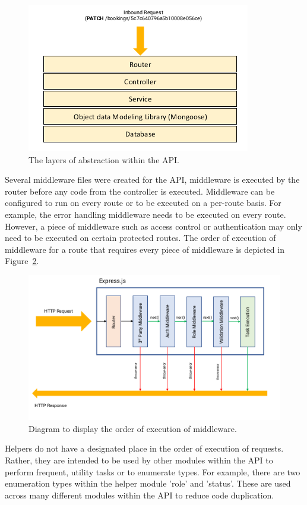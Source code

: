 \begin{figure}[!htb]
	\centering
	\includegraphics[width=0.75\linewidth]{Resources/img/abstraction_layers.png}
	\caption{The layers of abstraction within the API.}
	\label{fig:abstraction_layers}
\end{figure}

Several middleware files were created for the API, middleware is executed by the router before any code from the controller is executed. Middleware can be configured to run on every route or to be executed on a per-route basis. For example, the error handling middleware needs to be executed on every route. However, a piece of middleware such as access control or authentication may only need to be executed on certain protected routes. The order of execution of middleware for a route that requires every piece of middleware is depicted in Figure~\ref{fig:middleware}.

\newpage

\begin{figure}[!htb]
	\centering
	\includegraphics[width=0.75\linewidth]{Resources/img/middleware.png}
	\caption{Diagram to display the order of execution of middleware.}
	\label{fig:middleware}
\end{figure}

Helpers do not have a designated place in the order of execution of requests. Rather, they are intended to be used by other modules within the API to perform frequent, utility tasks or to enumerate types. For example, there are two enumeration types within the helper module 'role' and 'status'. These are used across many different modules within the API to reduce code duplication.

